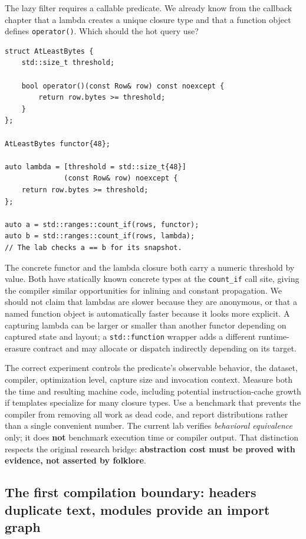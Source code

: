The lazy filter requires a callable predicate. We already know from the callback chapter that a lambda creates a unique closure type and that a function object defines \texttt{operator()}. Which should the hot query use?

\begin{verbatim}
struct AtLeastBytes {
    std::size_t threshold;

    bool operator()(const Row& row) const noexcept {
        return row.bytes >= threshold;
    }
};

AtLeastBytes functor{48};

auto lambda = [threshold = std::size_t{48}]
              (const Row& row) noexcept {
    return row.bytes >= threshold;
};

auto a = std::ranges::count_if(rows, functor);
auto b = std::ranges::count_if(rows, lambda);
// The lab checks a == b for its snapshot.
\end{verbatim}

The concrete functor and the lambda closure both carry a numeric threshold by value. Both have statically known concrete types at the \texttt{count\_if} call site, giving the compiler similar opportunities for inlining and constant propagation. We should not claim that lambdas are slower because they are anonymous, or that a named function object is automatically faster because it looks more explicit. A capturing lambda can be larger or smaller than another functor depending on captured state and layout; a \texttt{std::function} wrapper adds a different runtime-erasure contract and may allocate or dispatch indirectly depending on its target.

The correct experiment controls the predicate's observable behavior, the dataset, compiler, optimization level, capture size and invocation context. Measure both the time and resulting machine code, including potential instruction-cache growth if templates specialize for many closure types. Use a benchmark that prevents the compiler from removing all work as dead code, and report distributions rather than a single convenient number. The current lab verifies \emph{behavioral equivalence} only; it does \textbf{not} benchmark execution time or compiler output. That distinction respects the original research bridge: \textbf{abstraction cost must be proved with evidence, not asserted by folklore}.

\subsection{The first compilation boundary: headers duplicate text, modules provide an import graph}\label{05-engine-i-ch006-the-first-compilation-boundary-headers-duplicate-text-modules-provide-an-import-graph}

